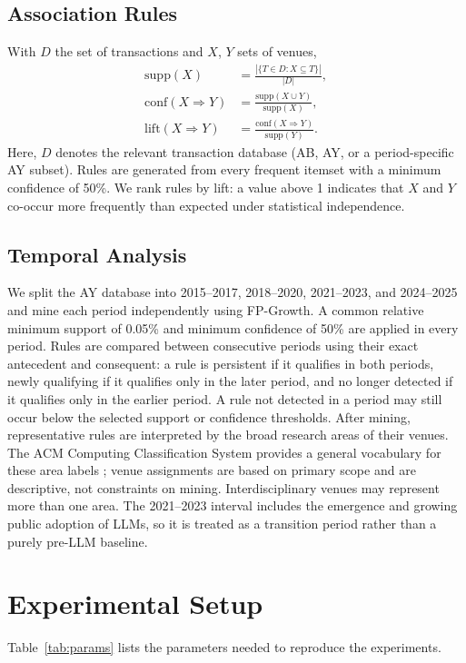 \documentclass[conference]{IEEEtran}
\begin{document}
\subsection{Association Rules}
With $D$ the set of transactions and $X$, $Y$ sets of venues,
\begin{align}
\mathrm{supp}(X) &= \frac{|\{T\in D : X\subseteq T\}|}{|D|},\\
\mathrm{conf}(X\Rightarrow Y) &= \frac{\mathrm{supp}(X\cup Y)}{\mathrm{supp}(X)},\\
\mathrm{lift}(X\Rightarrow Y) &= \frac{\mathrm{conf}(X\Rightarrow Y)}{\mathrm{supp}(Y)}.
\end{align}
Here, $D$ denotes the relevant transaction database (AB, AY, or a period-specific AY subset). Rules are generated from every frequent itemset with a minimum confidence of 50\%. We rank rules by lift: a value above 1 indicates that $X$ and $Y$ co-occur more frequently than expected under statistical independence.

\subsection{Temporal Analysis}
We split the AY database into 2015--2017, 2018--2020, 2021--2023, and 2024--2025 and mine each period independently using FP-Growth. A common relative minimum support of 0.05\% and minimum confidence of 50\% are applied in every period. Rules are compared between consecutive periods using their exact antecedent and consequent: a rule is persistent if it qualifies in both periods, newly qualifying if it qualifies only in the later period, and no longer detected if it qualifies only in the earlier period. A rule not detected in a period may still occur below the selected support or confidence thresholds. After mining, representative rules are interpreted by the broad research areas of their venues. The ACM Computing Classification System provides a general vocabulary for these area labels \cite{acmccs}; venue assignments are based on primary scope and are descriptive, not constraints on mining. Interdisciplinary venues may represent more than one area. The 2021--2023 interval includes the emergence and growing public adoption of LLMs, so it is treated as a transition period rather than a purely pre-LLM baseline.

\section{Experimental Setup}
Table~\ref{tab:params} lists the parameters needed to reproduce the experiments.
\end{document}
